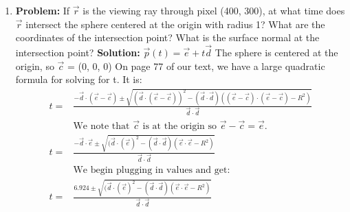 \documentclass[a4paper, 12pt]{article}
\begin{document}
\begin{enumerate}
    \item \textbf{Problem:} If $\vec{r}$ is the viewing ray through pixel (400, 300), at what time does $\vec{r}$ intersect the sphere centered at the origin with radius 1? What are the coordinates of the intersection point?  What is the surface normal at the intersection point?
        \textbf{Solution:} $\vec{p}(t) = \vec{e} + t\vec{d}$ The sphere is centered at the origin, so $\vec{c}$ = (0, 0, 0) On page 77 of our text, we have a large quadratic formula for solving for t. It is:
        \begin{align*}
            t =& \frac{-\vec{d}\cdot(\vec{e}-\vec{c}) \pm \sqrt{(\vec{d}\cdot(\vec{e}-\vec{c}))^2 - (\vec{d}\cdot\vec{d})\left( (\vec{e}-\vec{c})\cdot(\vec{e}-\vec{c}) - R^2 \right)}}{\vec{d}\cdot\vec{d}}\\
            &\text{We note that $\vec{c}$ is at the origin so $\vec{e} - \vec{c} = \vec{e}$.}\\
            t =& \frac{-\vec{d}\cdot\vec{e} \pm \sqrt{(\vec{d}\cdot(\vec{e})^2 - (\vec{d}\cdot\vec{d})\left( \vec{e}\cdot\vec{e} - R^2 \right)}}{\vec{d}\cdot\vec{d}}\\
            &\text{We begin plugging in values and get:}\\
            t =& \frac{6.924 \pm \sqrt{(\vec{d}\cdot(\vec{e})^2 - (\vec{d}\cdot\vec{d})\left( \vec{e}\cdot\vec{e} - R^2 \right)}}{\vec{d}\cdot\vec{d}}\\
        \end{align*}




\end{enumerate}
\end{document}
